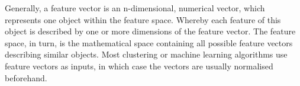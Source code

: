 Generally, a feature vector is an n-dimensional, numerical vector, which represents one object within the feature space. Whereby each feature of this object is described by one or more dimensions of the feature vector.
The feature space, in turn, is the mathematical space containing all possible feature vectors describing similar objects.
Most clustering or machine learning algorithms use feature vectors as inputs, in which case the vectors are usually normalised beforehand.

